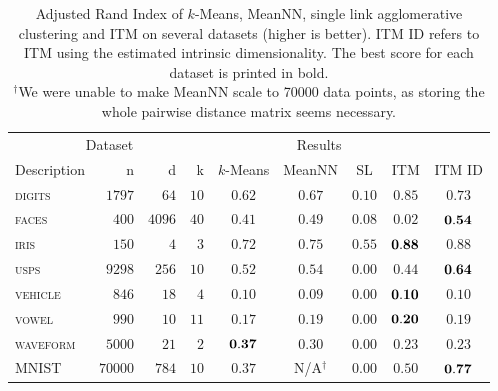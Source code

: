 \begin{table}[t]
\centering
\begin{tabularx}{\linewidth}{@{\extracolsep{\fill}}lrrrccccc}
\toprule
\multicolumn{4}{c}{Dataset} &\multicolumn{4}{c}{Results}\\
\cmidrule{1-4}
\cmidrule{5-9}
Description &     n &    d &   k &  $k$-Means      & MeanNN        & SL            &   ITM        & ITM ID \\
\cmidrule{1-4}                   \cmidrule{5-5}    \cmidrule{6-6}  \cmidrule{7-7} \cmidrule{8-8} \cmidrule{9-9}
\textsc{digits}      &$ 1797$&$  64$&$ 10$& $    0.62 $&     $0.67$           &$0.10$         &$\mathbf{0.85}$       &$0.73$\\ 
\textsc{faces}       &$  400$&$4096$&$ 40$& $    0.41 $&     $0.49$           &$0.08$         &$0.02$           &$\mathbf{0.54}$\\ 
\textsc{iris}        &$  150$&$   4$&$  3$& $    0.72 $&     $0.75$           &$0.55$         &$\mathbf{0.88}$       &$0.88$\\
\textsc{usps}        &$ 9298$&$ 256$&$ 10$& $    0.52 $&     $0.54$           &$0.00$         &$   0.44$        &$\mathbf{0.64}$\\ 
\textsc{vehicle}     &$  846$&$  18$&$  4$& $    0.10 $&     $0.09$           &$0.00$         &$\mathbf{0.10}$       &$0.10$\\
\textsc{vowel}       &$  990$&$  10$&$ 11$& $    0.17 $&     $0.19$           &$0.00$         &$\mathbf{0.20}$       &$0.19$\\
\textsc{waveform}    &$ 5000$&$  21$&$  2$& $\mathbf{0.37} $&     $0.30$           &$0.00$         &$   0.23 $       &$0.23$\\
\textsc{MNIST}       &$70000$&$ 784$&$ 10$& $    0.37 $&     N/A$^\dagger$    &$0.00$         &$   0.50$        &$\mathbf{0.77}$\\
\bottomrule
\end{tabularx}
\caption{Adjusted Rand Index of $k$-Means, MeanNN, single link agglomerative
    clustering and ITM on several datasets (higher is better). ITM ID refers to
    ITM using the estimated intrinsic dimensionality. The best score for each
    dataset is printed in bold.\\$^\dagger$\footnotesize We were unable to make
    MeanNN scale to 70000 data points, as storing the whole pairwise distance
    matrix seems necessary.\label{results}}
\end{table}


